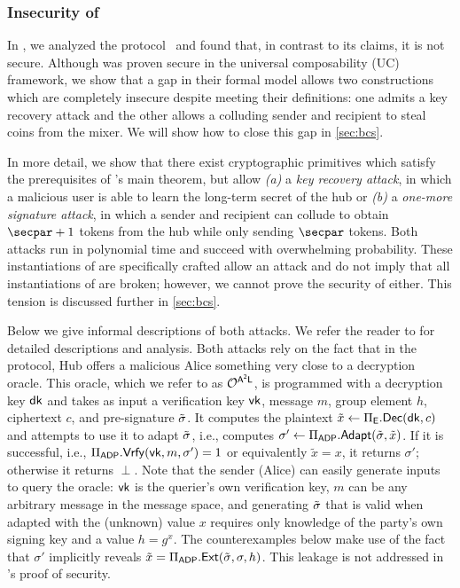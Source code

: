 \subsubsection{Insecurity of \texorpdfstring{\AAL}{A2L}}\label{sec:a2l-attacks}

In \cite{CCS:GMMMTT22}, we analyzed the \AAL protocol~\cite{SP:TaiMorMaf21} and found that, in contrast to its claims, it is not secure. Although \AAL was proven secure in the universal composability (UC)~\cite{FOCS:Canetti01} framework, we show that a gap in their formal model allows two constructions which are completely insecure despite meeting their definitions: one admits a key recovery attack and the other allows a colluding sender and recipient to steal coins from the mixer. We will show how to close this gap in \cref{sec:bcs}.

In more detail, we show that there exist cryptographic primitives which satisfy the prerequisites of \AAL's main theorem, but allow \textit{(a)} a \emph{key recovery attack}, in which a malicious user is able to learn the long-term secret of the hub or \textit{(b)} a \emph{one-more signature attack}, in which a sender and recipient can collude to obtain $\secpar+1$ tokens from the hub while only sending $\secpar$ tokens. Both attacks run in polynomial time and succeed with overwhelming probability. These instantiations of \AAL are specifically crafted allow an attack and do not imply that all instantiations of \AAL are broken; however, we cannot prove the security of \AAL either. This tension is discussed further in \cref{sec:bcs}.

Below we give informal descriptions of both attacks. We refer the reader to \cite{CCS:GMMMTT22} for detailed descriptions and analysis. Both attacks rely on the fact that in the \AAL protocol, Hub offers a malicious Alice something very close to a decryption oracle. This oracle, which we refer to as $\mathcal{O}^{\sf A^2L}$, is programmed with a decryption key $\mathsf{dk}$ and takes as input a verification key $\mathsf{vk}$, message $m$, group element $h$, ciphertext $c$, and pre-signature $\tilde{\sigma}$. It computes the plaintext $\tilde{x} \gets \Pi_{\mathsf{E}}.\mathsf{Dec}(\mathsf{dk}, c)$ and attempts to use it to adapt $\tilde{\sigma}$, i.e., computes $\sigma' \gets \Pi_{\mathsf{ADP}}.\mathsf{Adapt}(\tilde{\sigma}, \tilde{x})$. If it is successful, i.e., $\Pi_{\mathsf{ADP}}.\mathsf{Vrfy}(\mathsf{vk}, m, \sigma') = 1$ or equivalently $\tilde{x} = x$, it returns $\sigma'$; otherwise it returns $\perp$. Note that the sender (Alice) can easily generate inputs to query the oracle: $\mathsf{vk}$ is the querier's own verification key, $m$ can be any arbitrary message in the message space, and generating $\tilde{\sigma}$ that is valid when adapted with the (unknown) value $x$ requires only knowledge of the party's own signing key and a value $h = g^x$. The counterexamples below make use of the fact that $\sigma'$ implicitly reveals $\tilde{x} = \Pi_{\mathsf{ADP}}.\mathsf{Ext}(\tilde{\sigma}, \sigma, h)$. This leakage is not addressed in \AAL's proof of security.

